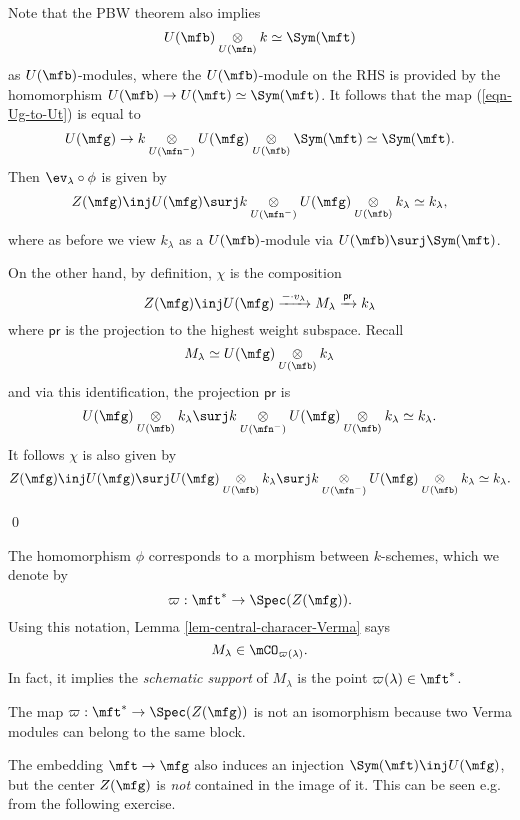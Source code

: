 	Note that the PBW theorem also implies
	\[
		U(\mfb)\ot_{U(\mfn)} k \simeq \Sym(\mft)
	\]
	as $U(\mfb)$-modules, where the $U(\mfb)$-module on the RHS is provided by the homomorphism $U(\mfb) \to U(\mft)\simeq \Sym(\mft)$. It follows that the map (\ref{eqn-Ug-to-Ut}) is equal to
	\[
		U(\mfg) \to k \ot_{U(\mfn^-)} U(\mfg) \ot_{U(\mfb)} \Sym(\mft) \simeq \Sym(\mft).
	\]
	Then $\ev_\lambda\circ \phi$ is given by
	\[
		Z(\mfg)\inj U(\mfg) \surj k \ot_{U(\mfn^-)} U(\mfg) \ot_{U(\mfb)} k_\lambda \simeq k_\lambda,
	\]
	where as before we view $k_\lambda$ as a $U(\mfb)$-module via $U(\mfb)\surj \Sym(\mft)$.

	On the other hand, by definition, $\chi$ is the composition
	\[
		Z(\mfg) \inj U(\mfg) \xrightarrow{-\cdot v_\lambda} M_\lambda \xrightarrow{\mathsf{pr}} k_\lambda
	\]
	where $\mathsf{pr}$ is the projection to the highest weight subspace. Recall
	\[
		M_\lambda \simeq U(\mfg) \ot_{U(\mfb)} k_\lambda
	\]
	and via this identification, the projection $\mathsf{pr}$ is
	\[
		U(\mfg) \ot_{U(\mfb)} k_\lambda \surj k \ot_{U(\mfn^-)} U(\mfg) \ot_{U(\mfb)} k_\lambda \simeq k_\lambda.
	\]
	It follows $\chi$ is also given by
	\[
		Z(\mfg) \inj U(\mfg) \surj U(\mfg) \ot_{U(\mfb)} k_\lambda \surj k \ot_{U(\mfn^-)} U(\mfg) \ot_{U(\mfb)} k_\lambda \simeq k_\lambda.
	\]
	
\qed


\begin{notn}
	The homomorphism $\phi$ corresponds to a morphism between $k$-schemes, which we denote by
	\[
		\varpi: \mft^* \to \Spec(Z(\mfg)).
	\]
	Using this notation, Lemma \ref{lem-central-characer-Verma} says
	\[
		M_\lambda \in \mCO_{\varpi(\lambda)}.
	\]
	In fact, it implies the \emph{schematic support} of $M_\lambda$ is the point $\varpi(\lambda)\in \mft^*$.
\end{notn}

\begin{rem}
	The map $\varpi: \mft^* \to \Spec(Z(\mfg))$ is not an isomorphism because two Verma modules can belong to the same block.
\end{rem}

\begin{warn}
	The embedding $\mft\to \mfg$ also induces an injection $\Sym(\mft) \inj U(\mfg)$, but the center $Z(\mfg)$ is \emph{not} contained in the image of it. This can be seen e.g. from the following exercise.
\end{warn}

